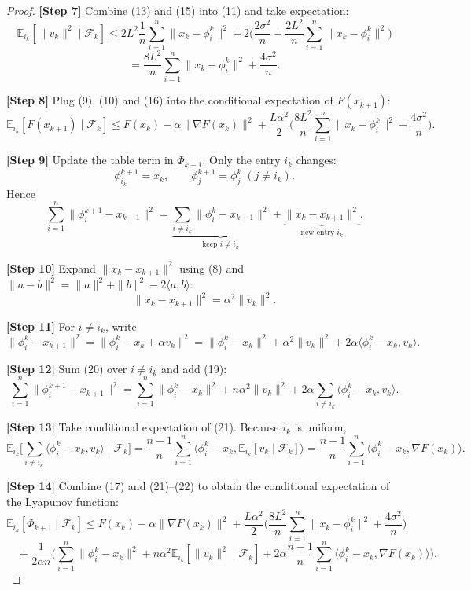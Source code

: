 \documentclass{article}
\newcommand{\E}{\mathbb{E}}
\begin{document}
\begin{proof}
\noindent\textbf{[Step 7]} Combine (13) and (15) into (11) and take expectation:
\[
\E_{i_k}[\|v_k\|^{2}\mid\mathcal{F}_k]
\le 2L^{2}\frac1n\sum_{i=1}^{n}\|x_k-\phi_i^{k}\|^{2}
+ 2\Big(\frac{2\sigma^{2}}{n}+ \frac{2L^{2}}{n}\sum_{i=1}^{n}\|x_k-\phi_i^{k}\|^{2}\Big)
\]
\[
= \frac{8L^{2}}{n}\sum_{i=1}^{n}\|x_k-\phi_i^{k}\|^{2}
+ \frac{4\sigma^{2}}{n}.
\tag{16}
\]

\noindent\textbf{[Step 8]} Plug (9), (10) and (16) into the conditional expectation of $F(x_{k+1})$:
\[
\E_{i_k}[F(x_{k+1})\mid\mathcal{F}_k]
\le F(x_k)-\alpha\|\nabla F(x_k)\|^{2}
+\frac{L\alpha^{2}}{2}\Big(\frac{8L^{2}}{n}\sum_{i=1}^{n}\|x_k-\phi_i^{k}\|^{2}
+ \frac{4\sigma^{2}}{n}\Big).
\tag{17}
\]

\noindent\textbf{[Step 9]} Update the table term in $\Phi_{k+1}$.
Only the entry $i_k$ changes:
\[
\phi_{i_k}^{k+1}=x_k,\qquad
\phi_{j}^{k+1}=\phi_{j}^{k}\;(j\neq i_k).
\]
Hence
\[
\sum_{i=1}^{n}\|\phi_i^{k+1}-x_{k+1}\|^{2}
= \underbrace{\sum_{i\neq i_k}\|\phi_i^{k}-x_{k+1}\|^{2}}_{\text{keep }i\neq i_k}
+ \underbrace{\|x_k-x_{k+1}\|^{2}}_{\text{new entry }i_k}.
\tag{18}
\]

\noindent\textbf{[Step 10]} Expand $\|x_k-x_{k+1}\|^{2}$ using (8) and $\|a-b\|^{2}= \|a\|^{2}+ \|b\|^{2}-2\langle a,b\rangle$:
\[
\|x_k-x_{k+1}\|^{2}= \alpha^{2}\|v_k\|^{2}.
\tag{19}
\]

\noindent\textbf{[Step 11]} For $i\neq i_k$, write
\[
\|\phi_i^{k}-x_{k+1}\|^{2}
= \|\phi_i^{k}-x_k+\alpha v_k\|^{2}
= \|\phi_i^{k}-x_k\|^{2}+ \alpha^{2}\|v_k\|^{2}+2\alpha\langle\phi_i^{k}-x_k,v_k\rangle.
\tag{20}
\]

\noindent\textbf{[Step 12]} Sum (20) over $i\neq i_k$ and add (19):
\[
\sum_{i=1}^{n}\|\phi_i^{k+1}-x_{k+1}\|^{2}
= \sum_{i=1}^{n}\|\phi_i^{k}-x_k\|^{2}
+ n\alpha^{2}\|v_k\|^{2}
+2\alpha\sum_{i\neq i_k}\langle\phi_i^{k}-x_k,v_k\rangle.
\tag{21}
\]

\noindent\textbf{[Step 13]} Take conditional expectation of (21). Because $i_k$ is uniform,
\[
\E_{i_k}\Big[\sum_{i\neq i_k}\langle\phi_i^{k}-x_k,v_k\rangle\mid\mathcal{F}_k\Big]
= \frac{n-1}{n}\sum_{i=1}^{n}\langle\phi_i^{k}-x_k,\E_{i_k}[v_k\mid\mathcal{F}_k]\rangle
= \frac{n-1}{n}\sum_{i=1}^{n}\langle\phi_i^{k}-x_k,\nabla F(x_k)\rangle .
\tag{22}
\]

\noindent\textbf{[Step 14]} Combine (17) and (21)–(22) to obtain the conditional expectation of the Lyapunov function:
\[
\E_{i_k}[\Phi_{k+1}\mid\mathcal{F}_k]
\le F(x_k)-\alpha\|\nabla F(x_k)\|^{2}
+\frac{L\alpha^{2}}{2}\Big(\frac{8L^{2}}{n}\sum_{i=1}^{n}\|x_k-\phi_i^{k}\|^{2}
+ \frac{4\sigma^{2}}{n}\Big)
\]
\[
\quad+\frac{1}{2\alpha n}\Big(\sum_{i=1}^{n}\|\phi_i^{k}-x_k\|^{2}
+ n\alpha^{2}\E_{i_k}[\|v_k\|^{2}\mid\mathcal{F}_k]
+2\alpha\frac{n-1}{n}\sum_{i=1}^{n}\langle\phi_i^{k}-x_k,\nabla F(x_k)\rangle\Big).
\tag{23}
\]


\end{proof}
\end{document}
